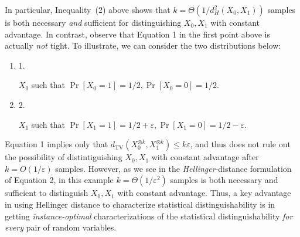 In particular, Inequality (2) above shows that $k=\Theta\left(1/d^{2}_{H}(X_{0},X_{1})\right)$ samples is both necessary \emph{and} sufficient for distinguishing $X_{0},X_{1}$ with constant advantage. In contrast, observe that Equation 1 in the first point above is actually \emph{not} tight. To illustrate, we can consider the two distributions below:\par


\begin{enumerate}


\item[] 
1. 


$X_{0}$ such that $\Pr[X_{0}=1]=1/2,\Pr[X_{0}=0]=1/2$.\par





\item[] 
2. 


$X_{1}$ such that $\Pr[X_{1}=1]=1/2+\varepsilon,\Pr[X_{1}=0]=1/2-\varepsilon$.\par





\end{enumerate}




Equation 1 implies only that $d_{\mathrm{TV}}(X_{0}^{\otimes k},X_{1}^{\otimes k})\leq k\varepsilon$, and thus does not rule out the possibility of distintiguishing $X_{0},X_{1}$ with constant advantage after $k=O(1/\varepsilon)$ samples. However, as we see in the \emph{Hellinger}-distance formulation of Equation 2, in this example $k=\Theta(1/\varepsilon^{2})$ samples is both necessary and sufficient to distinguish $X_{0},X_{1}$ with constant advantage. Thus, a key advantage in using Hellinger distance to characterize statistical distinguishability is in getting \emph{instance-optimal} characterizations of the statistical distinguishability \emph{for every} pair of random variables.\par




